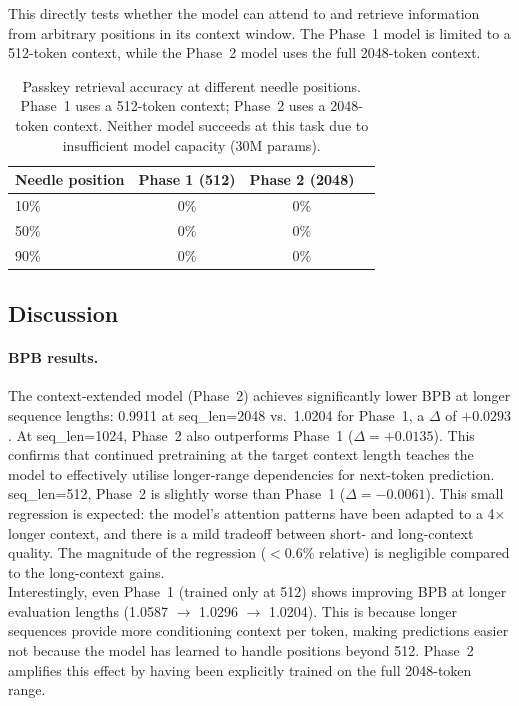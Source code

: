 \documentclass[a4paper,12pt]{article}
\begin{document}
This directly tests whether the model can attend to and retrieve
information from arbitrary positions in its context window.  The
Phase~1 model is limited to a 512-token context, while the Phase~2
model uses the full 2048-token context.

\begin{table}[H]
\centering
\begin{tabular}{lccc}
\toprule
\textbf{Needle position} & \textbf{Phase 1 (512)} & \textbf{Phase 2 (2048)} \\
\midrule
10\% & 0\% & 0\% \\
50\% & 0\% & 0\% \\
90\% & 0\% & 0\% \\
\bottomrule
\end{tabular}
\caption{Passkey retrieval accuracy at different needle positions.
  Phase~1 uses a 512-token context; Phase~2 uses a 2048-token context.
  Neither model succeeds at this task due to insufficient model capacity (30M params).}
\label{tab:passkey}
\end{table}

\subsection{Discussion}

\paragraph{BPB results.}
The context-extended model (Phase~2) achieves significantly lower BPB at
longer sequence lengths: 0.9911 at seq\_len=2048 vs.\ 1.0204 for Phase~1,
a $\Delta$ of $+0.0293$.  At seq\_len=1024, Phase~2 also outperforms
Phase~1 ($\Delta = +0.0135$).  This confirms that continued pretraining at
the target context length teaches the model to effectively utilise longer-range
dependencies for next-token prediction. \\

seq\_len=512, Phase~2 is slightly worse than Phase~1 ($\Delta = -0.0061$).
This small regression is expected: the model's attention patterns have been
adapted to a 4$\times$ longer context, and there is a mild tradeoff between
short- and long-context quality.  The magnitude of the regression ($<$0.6\%
relative) is negligible compared to the long-context gains. \\

Interestingly, even Phase~1 (trained only at 512) shows improving BPB at
longer evaluation lengths (1.0587 $\rightarrow$ 1.0296 $\rightarrow$ 1.0204).
This is because longer sequences provide more conditioning context per token,
making predictions easier not because the model has learned to handle
positions beyond 512.  Phase~2 amplifies this effect by having been explicitly
trained on the full 2048-token range.
\end{document}
